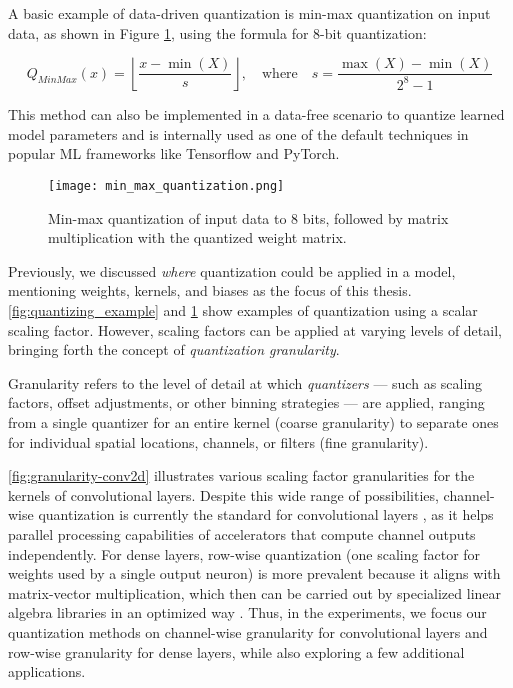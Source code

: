 A basic example of data-driven quantization is min-max quantization on input data, as shown in Figure \ref{fig:min_max_quantization},
using the formula for 8-bit quantization:

\[
Q_{\textit{MinMax}}(x) = \left\lfloor \frac{x - \min(X)}{s} \right\rfloor, \quad
\text{where} \quad s = \frac{\max(X) - \min(X)}{2^8 - 1}
\]

This method can also be implemented in a data-free scenario to quantize learned model parameters and is internally used as one of the
default techniques in popular ML frameworks like Tensorflow and PyTorch. 

\begin{figure}[t!]
  \centering
  \texttt{[image: min\_max\_quantization.png]}
  \caption{ Min-max quantization of input data to 8 bits, followed by matrix multiplication with the quantized weight matrix.}
  \label{fig:min_max_quantization}
\end{figure}

Previously, we discussed \textit{where} quantization could be applied in a model, 
mentioning weights, kernels, and biases as the focus of this thesis.
\cref{fig:quantizing_example} and \cref{fig:min_max_quantization} show examples of quantization
using a scalar scaling factor. 
However, scaling factors can be applied at varying levels of detail,
bringing forth the concept of \textit{quantization granularity}.

Granularity refers to the level of detail at which \textit{quantizers} — such as scaling factors, offset adjustments, or other binning strategies 
— are applied,
ranging from a single quantizer for an entire kernel (coarse granularity) to separate ones for individual spatial locations,
channels, or filters (fine granularity). 

\cref{fig:granularity-conv2d} illustrates various scaling factor granularities
for the kernels of convolutional layers.
Despite this wide range of possibilities, channel-wise quantization is currently the standard for convolutional layers \cite{gholami2021survey},
as it helps parallel processing capabilities of accelerators that compute channel outputs independently. 
For dense layers, row-wise quantization (one scaling factor for weights used by a single output neuron) is more prevalent
because it aligns with matrix-vector multiplication, which then can be carried out by specialized linear algebra libraries
in an optimized way \cite{DBLP:journals/corr/abs-2101-05615}.
Thus, in the experiments, we focus our quantization methods on channel-wise granularity for convolutional layers
and row-wise granularity for dense layers, 
while also exploring a few additional applications.

